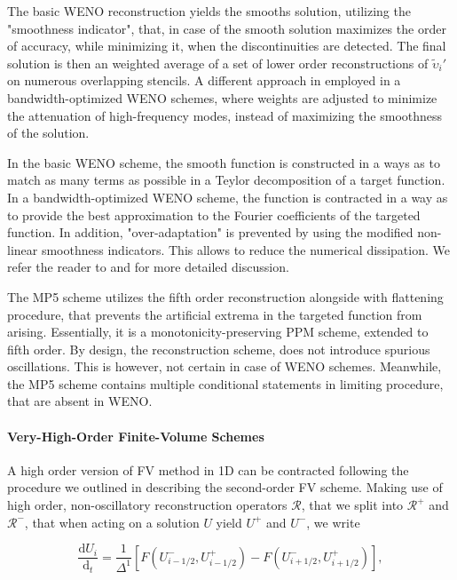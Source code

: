 The basic WENO reconstruction yields the smooths solution, utilizing the "smoothness indicator", that, in case of the smooth solution maximizes the order of accuracy, while minimizing it, when the discontinuities are detected. 
The final solution is then an weighted average of a set of lower order reconstructions of $\widetilde{\upsilon}_i '$ on numerous overlapping stencils. 
A different approach in employed in a bandwidth-optimized WENO schemes, where weights are adjusted to minimize the attenuation of high-frequency modes, instead of maximizing the smoothness of the solution. 

In the basic WENO scheme, the smooth function is constructed in a ways as to match as many terms as possible in a Teylor decomposition of a target function. 
In a bandwidth-optimized WENO scheme, the function is contracted in a way as to provide the best approximation to the Fourier coefficients of the targeted function. 
In addition, "over-adaptation" is prevented by using the modified non-linear smoothness indicators. 
This allows to reduce the numerical dissipation. 
We refer the reader to \cite{Martin:2006} and \cite{Taylor:2007} for more detailed discussion. 

The MP5 scheme utilizes the fifth order reconstruction alongside with flattening procedure, that prevents the artificial extrema in the targeted function from arising. 
Essentially, it is a monotonicity-preserving PPM scheme, extended to fifth order. 
By design, the reconstruction scheme, does not introduce spurious oscillations. 
This is however, not certain in case of WENO schemes. Meanwhile, the MP5 scheme contains multiple conditional statements in limiting procedure, that are absent in WENO.


\paragraph{Very-High-Order Finite-Volume Schemes}



A high order version of FV method in 1D can be contracted following the procedure we outlined in describing the second-order FV scheme. 
Making use of high order, non-oscillatory reconstruction operators $\mathcal{R}$, that we split into $\mathcal{R}^+$ and $\mathcal{R}^-$, that when acting on a solution $U$ yield $U^+$ and $U^-$, we write 

\begin{equation}
\frac{\text{d}U_i}{\text{d}_t} = \frac{1}{\Delta^1}[F(U^{-}_{i-1/2},U^{+}_{i-1/2}) - F(U^{-}_{i+1/2},U^{+}_{i+1/2})],
\end{equation}

